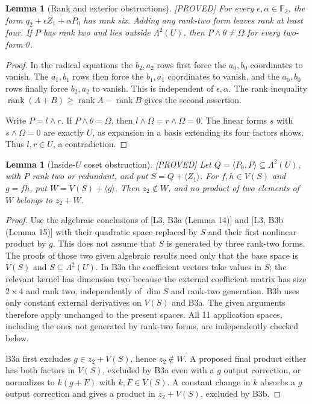 \documentclass[11pt,a4paper]{article}
\newtheorem{lemma}[theorem]{Lemma}
\newcommand{\rk}{\operatorname{rank}}
\newcommand{\status}[1]{\hfill\textsf{[#1]}}
\begin{document}
\begin{lemma}[Rank and exterior obstructions]\label{lem:rankext}\status{PROVED}
For every $\epsilon,\alpha\in\mathbb F_2$, the form $q_2+\epsilon Z_1+\alpha P_0$ has rank six. Adding any rank-two form leaves rank at least four. If $P$ has rank two and lies outside $\Lambda^2(U)$, then $P\wedge\theta\ne\Omega$ for every two-form $\theta$.
\end{lemma}
\begin{proof}
In the radical equations the $b_2,a_2$ rows first force the $a_0,b_0$ coordinates to vanish. The $a_1,b_1$ rows then force the $b_1,a_1$ coordinates to vanish, and the $a_0,b_0$ rows finally force $b_2,a_2$ to vanish. This is independent of $\epsilon,\alpha$. The rank inequality $\rk(A+B)\ge\rk A-\rk B$ gives the second assertion.

Write $P=l\wedge r$. If $P\wedge\theta=\Omega$, then $l\wedge\Omega=r\wedge\Omega=0$. The linear forms $s$ with $s\wedge\Omega=0$ are exactly $U$, as expansion in a basis extending its four factors shows. Thus $l,r\in U$, a contradiction.
\end{proof}

\begin{lemma}[Inside-$U$ coset obstruction]\label{lem:coset}\status{PROVED}
Let $Q=\langle P_0,P\rangle\subseteq\Lambda^2(U)$, with $P$ rank two or redundant, and put $S=Q+\langle Z_1\rangle$. For $f,h\in V(S)$ and $g=fh$, put $W=V(S)+\langle g\rangle$. Then $z_2\notin W$, and no product of two elements of $W$ belongs to $z_2+W$.
\end{lemma}
\begin{proof}
Use the algebraic conclusions of [L3, B3a (Lemma 14)] and [L3, B3b (Lemma 15)] with their quadratic space replaced by $S$ and their first nonlinear product by $g$. This does not assume that $S$ is generated by three rank-two forms. The proofs of those two given algebraic results need only that the base space is $V(S)$ and $S\subseteq\Lambda^2(U)$. In B3a the coefficient vectors take values in $S$; the relevant kernel has dimension two because the external coefficient matrix has size $2\times4$ and rank two, independently of $\dim S$ and rank-two generation. B3b uses only constant external derivatives on $V(S)$ and B3a. The given arguments therefore apply unchanged to the present spaces. All 11 application spaces, including the ones not generated by rank-two forms, are independently checked below.

B3a first excludes $g\in z_2+V(S)$, hence $z_2\notin W$. A proposed final product either has both factors in $V(S)$, excluded by B3a even with a $g$ output correction, or normalizes to $k(g+F)$ with $k,F\in V(S)$. A constant change in $k$ absorbs a $g$ output correction and gives a product in $z_2+V(S)$, excluded by B3b.
\end{proof}
\end{document}
